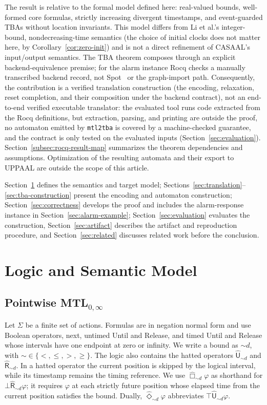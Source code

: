 \documentclass{ieeeaccess}
\newcommand{\hUntil}{\mathbin{\widehat{\mathsf{U}}}}
\newcommand{\hRelease}{\mathbin{\widehat{\mathsf{R}}}}
\begin{document}
The result is relative to the formal model defined here: real-valued bounds,
well-formed core formulas, strictly increasing divergent timestamps, and
event-guarded TBAs without location invariants. This model differs from Li et al.'s integer-bound,
nondecreasing-time semantics (the choice of initial clocks does not matter here, by Corollary~\ref{cor:zero-init}) and is not a direct refinement of
CASAAL's input/output semantics. The TBA theorem composes through an explicit
backend-equivalence premise; for the alarm instance Rocq checks a manually
transcribed backend record, not Spot~\cite{[spot]} or the graph-import path. Consequently, the
contribution is a verified translation construction (the encoding, relaxation,
reset completion, and their composition under the backend contract), not an
end-to-end verified executable translator: the evaluated tool runs code
extracted from the Rocq definitions, but extraction, parsing, and printing are
outside the proof, no automaton emitted by \texttt{mtl2tba} is covered by a
machine-checked guarantee, and the contract is only tested on the evaluated
inputs (Section~\ref{sec:evaluation}). Section~\ref{subsec:rocq-result-map}
summarizes the theorem dependencies and assumptions.
Optimization of the resulting automata and their export to UPPAAL are outside
the scope of this article.

Section~\ref{sec:logic} defines the semantics and target model;
Sections~\ref{sec:translation}--\ref{sec:tba-construction} present the encoding and
automaton construction; Section~\ref{sec:correctness} develops the proof and
includes the alarm-response instance in Section~\ref{sec:alarm-example};
Section~\ref{sec:evaluation} evaluates the construction,
Section~\ref{sec:artifact} describes the artifact and reproduction procedure,
and Section~\ref{sec:related} discusses related work before the conclusion.
\section{Logic and Semantic Model}
\label{sec:logic}
\subsection{Pointwise MTL$_{0,\infty}$}
\label{sec:mtl}
Let $\Sigma$ be a finite set of actions. Formulas are in negation normal
form and use Boolean operators, next, untimed Until and Release, and timed
Until and Release whose intervals have one endpoint at zero or infinity.
We write a bound as $\sim d$, with $\sim\in\{<,\le,>,\ge\}$. The logic also
contains the hatted operators $\hUntil_{\sim d}$ and
$\hRelease_{\sim d}$. In a hatted operator the current position is skipped
by the logical interval, while its timestamp remains the timing reference.
We use $\widehat{\Box}_{\sim d}\varphi$ as shorthand for
$\bot\hRelease_{\sim d}\varphi$; it requires $\varphi$ at each strictly
future position whose elapsed time from the current position satisfies the
bound. Dually, $\widehat{\Diamond}_{\sim d}\varphi$ abbreviates
$\top\hUntil_{\sim d}\varphi$.
\end{document}
